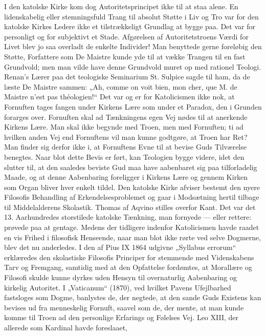 \documentclass[12pt,a4paper,openany]{book}
\newcommand{\opage}[1]{\marginnote{\footnotesize\textit{[#1]}}}
\begin{document}
I den katolske Kirke kom dog Autoritetsprincipet ikke til at staa
alene. En lidenskabelig eller stemningsfuld Trang til absolut Støtte
i Liv og Tro var for den katolske Kirkes Ledere ikke et tilstrækkeligt
Grundlag at bygge paa. Det var for personligt og for subjektivt
et Stade. Afgørelsen af Autoritetstroens Værdi for Livet blev jo saa
overladt de enkelte Individer! Man benyttede gerne foreløbig den
Støtte, Forfattere som De Maistre kunde yde til at vække Trangen
til en fast Grundvold; men man vilde have denne Grundvold muret
op med rationel Teologi. Renan’s Lærer paa det teologiske Seminarium
St. Sulpice sagde til ham, da de læste De Maistre sammen: „Ah,
comme on voit bien, mon cher, que M. de Maistre n’est pas théologien!“
Det var og er for Katolicismen ikke nok, at Fornuften tages
fangen under Kirkens Lære som under et Paradox, den i Grunden
forarges over. Fornuften skal ad Tænkningens egen Vej nødes til at
anerkende Kirkens Lære. Man skal ikke begynde med Troen, men
med Fornuften; ti ad hvilken anden Vej end Fornuftens vil man
kunne godtgøre, at Troen har Ret? Man finder sig derfor ikke i, at
Fornuftens Evne til at bevise Guds Tilværelse benegtes. Naar blot
dette Bevis er ført, kan Teologien bygge videre, idet den slutter til,
at den saaledes beviste Gud maa have aabenbaret sig paa tilforladelig
Maade, og at denne Aabenbaring foreligger i Kirkens Lære og gennem
Kirken som Organ bliver hver enkelt tildel. Den katolske Kirke
afviser bestemt den nyere Filosofis Behandling af Erkendelsesproblemet
og gaar i Modsætning hertil tilbage til Middelalderens Skolastik.
Thomas af Aqvino stilles overfor Kant. Det var det 13. Aarhundredes
storstilede katolske Tænkning, man fornyede --- eller rettere: prøvede
paa at gentage. Medens der tidligere indenfor Katolicismen havde
raadet en vis Frihed i filosofisk Henseende, naar man blot ikke rørte
ved selve Dogmerne, blev det nu anderledes. I den af Pius IX 1864 udgivne
„Syllabus errorum“ erklæredes den skolastiske Filosofis Principer
for stemmende med Videnskabens Tarv og Fremgang, samtidig
med at den Opfattelse fordømtes, at Morallære og Filosofi skulde
kunne dyrkes uden Hensyn til overnaturlig Aabenbaring og kirkelig
Autoritet. I „Vaticanum“ (1870), ved hvilket Pavens Ufejlbarhed
fastsloges som Dogme, banlystes de, der negtede, at den sande Guds
Existens kan bevises ud fra menneskelig Fornuft, saavel som de, der
\opage{119}mente, at man kunde komme til Troen ad den personlige Erfarings
og Følelses Vej. Leo XIII, der allerede som Kardinal havde foreslaaet,
\end{document}
